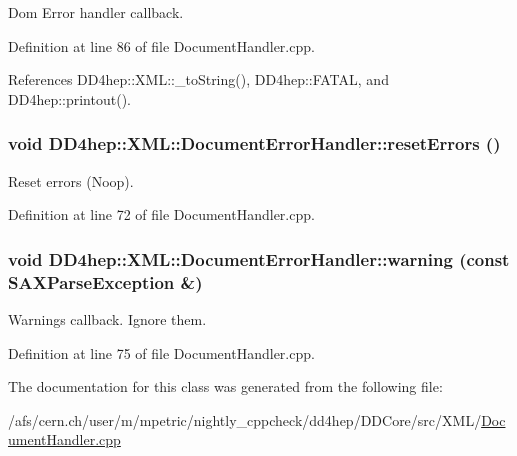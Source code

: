 Dom Error handler callback. 

Definition at line 86 of file DocumentHandler.cpp.

References DD4hep::XML::\_\-toString(), DD4hep::FATAL, and DD4hep::printout().\hypertarget{class_d_d4hep_1_1_x_m_l_1_1_document_error_handler_aed02c6f154e651f714709b8448ba8fe4}{
\subsubsection[{resetErrors}]{\setlength{\rightskip}{0pt plus 5cm}void DD4hep::XML::DocumentErrorHandler::resetErrors ()}}
\label{class_d_d4hep_1_1_x_m_l_1_1_document_error_handler_aed02c6f154e651f714709b8448ba8fe4}


Reset errors (Noop). 

Definition at line 72 of file DocumentHandler.cpp.\hypertarget{class_d_d4hep_1_1_x_m_l_1_1_document_error_handler_aea72a4df771def82a559fb89bee54489}{
\subsubsection[{warning}]{\setlength{\rightskip}{0pt plus 5cm}void DD4hep::XML::DocumentErrorHandler::warning (const SAXParseException \&)}}
\label{class_d_d4hep_1_1_x_m_l_1_1_document_error_handler_aea72a4df771def82a559fb89bee54489}


Warnings callback. Ignore them. 

Definition at line 75 of file DocumentHandler.cpp.

The documentation for this class was generated from the following file:\begin{DoxyCompactItemize}
\item 
/afs/cern.ch/user/m/mpetric/nightly\_\-cppcheck/dd4hep/DDCore/src/XML/\hyperlink{_document_handler_8cpp}{DocumentHandler.cpp}\end{DoxyCompactItemize}
